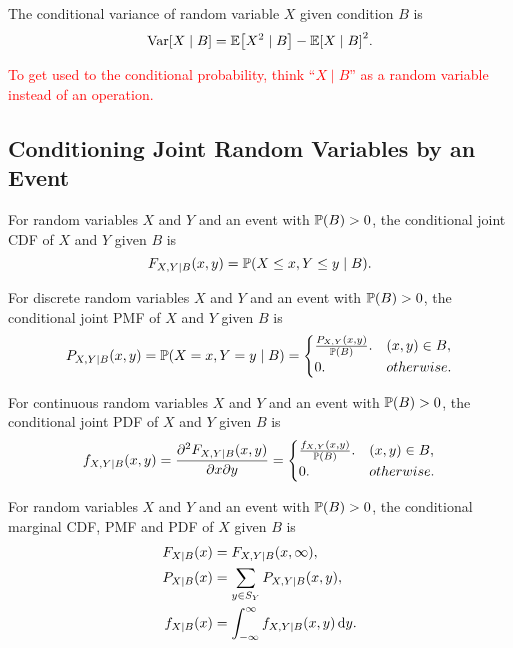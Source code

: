 \begin{theorem}
    The conditional variance of random variable $X$ given condition $B$ is
    \[\Var[X\mid B]=\E{X^2\mid B}-\E{X\mid B}^2.\]
\end{theorem}

\textcolor{red}{To get used to the conditional probability, think ``$X\mid B$'' as a random variable instead of an operation.}

\subsection{Conditioning Joint Random Variables by an Event}
\begin{definition}
    For random variables $X$ and $Y$ and an event with $\P{B}>0$, the conditional joint \textnormal{CDF} of $X$ and $Y$ given $B$ is
    \[F_{X,Y\mid B}(x,y)=\P{X\leq x,Y\leq y\mid B}.\]
\end{definition}

\begin{definition}
    For discrete random variables $X$ and $Y$ and an event with $\P{B}>0$, the conditional joint \textnormal{PMF} of $X$ and $Y$ given $B$ is
    \[P_{X,Y\mid B}(x,y)=\P{X=x,Y=y\mid B}={
        \begin{cases}
            \frac{P_{X,Y}(x,y)}{\P{B}}. & (x,y)\in B, \\
            0. & otherwise.
        \end{cases}
    }\]
\end{definition}

\begin{definition}
    For continuous random variables $X$ and $Y$ and an event with $\P{B}>0$, the conditional joint \textnormal{PDF} of $X$ and $Y$ given $B$ is
    \[f_{X,Y\mid B}(x,y)=\frac{\partial^2 F_{X,Y\mid B}(x,y)}{\partial x\partial y}={
        \begin{cases}
            \frac{f_{X,Y}(x,y)}{\P{B}}. & (x,y)\in B, \\
            0. & otherwise.
        \end{cases}
    }\]
\end{definition}

\begin{definition}
    For random variables $X$ and $Y$ and an event with $\P{B}>0$, the conditional marginal \textnormal{CDF}, \textnormal{PMF} and \textnormal{PDF} of $X$ given $B$ is
    \begin{align*}
        F_{X\mid B}(x)&=F_{X,Y\mid B}(x,\infty), \\
        P_{X\mid B}(x)&=\sum_{y\in S_Y}P_{X,Y\mid B}(x,y), \\
        f_{X\mid B}(x)&=\int_{-\infty}^{\infty}f_{X,Y\mid B}(x,y)\diff y.
    \end{align*}
\end{definition}

